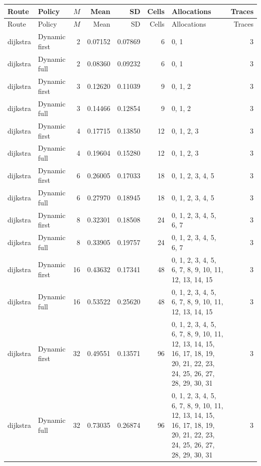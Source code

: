 \documentclass[10pt,a4paper]{article}
\begin{document}
\tiny\setlength{\tabcolsep}{2pt}\begin{longtable}{@{}p{23mm}p{29mm}rrrrp{36mm}r@{}}
\toprule Route & Policy & $M$ & Mean & SD & Cells & Allocations & Traces \\ \midrule\endfirsthead
\toprule Route & Policy & $M$ & Mean & SD & Cells & Allocations & Traces \\ \midrule\endhead
\bottomrule\endfoot
dijkstra & Dynamic first & 2 & 0.07152 & 0.07869 & 6 & 0, 1 & 3 \\
dijkstra & Dynamic full & 2 & 0.08360 & 0.09232 & 6 & 0, 1 & 3 \\
dijkstra & Dynamic first & 3 & 0.12620 & 0.11039 & 9 & 0, 1, 2 & 3 \\
dijkstra & Dynamic full & 3 & 0.14466 & 0.12854 & 9 & 0, 1, 2 & 3 \\
dijkstra & Dynamic first & 4 & 0.17715 & 0.13850 & 12 & 0, 1, 2, 3 & 3 \\
dijkstra & Dynamic full & 4 & 0.19604 & 0.15280 & 12 & 0, 1, 2, 3 & 3 \\
dijkstra & Dynamic first & 6 & 0.26005 & 0.17033 & 18 & 0, 1, 2, 3, 4, 5 & 3 \\
dijkstra & Dynamic full & 6 & 0.27970 & 0.18945 & 18 & 0, 1, 2, 3, 4, 5 & 3 \\
dijkstra & Dynamic first & 8 & 0.32301 & 0.18508 & 24 & 0, 1, 2, 3, 4, 5, 6, 7 & 3 \\
dijkstra & Dynamic full & 8 & 0.33905 & 0.19757 & 24 & 0, 1, 2, 3, 4, 5, 6, 7 & 3 \\
dijkstra & Dynamic first & 16 & 0.43632 & 0.17341 & 48 & 0, 1, 2, 3, 4, 5, 6, 7, 8, 9, 10, 11, 12, 13, 14, 15 & 3 \\
dijkstra & Dynamic full & 16 & 0.53522 & 0.25620 & 48 & 0, 1, 2, 3, 4, 5, 6, 7, 8, 9, 10, 11, 12, 13, 14, 15 & 3 \\
dijkstra & Dynamic first & 32 & 0.49551 & 0.13571 & 96 & 0, 1, 2, 3, 4, 5, 6, 7, 8, 9, 10, 11, 12, 13, 14, 15, 16, 17, 18, 19, 20, 21, 22, 23, 24, 25, 26, 27, 28, 29, 30, 31 & 3 \\
dijkstra & Dynamic full & 32 & 0.73035 & 0.26874 & 96 & 0, 1, 2, 3, 4, 5, 6, 7, 8, 9, 10, 11, 12, 13, 14, 15, 16, 17, 18, 19, 20, 21, 22, 23, 24, 25, 26, 27, 28, 29, 30, 31 & 3 \\
\end{longtable}\normalsize\setlength{\tabcolsep}{6pt}
\clearpage
\end{document}
